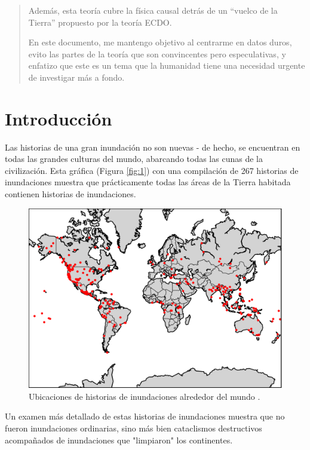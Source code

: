 \documentclass[10pt,twocolumn,letterpaper]{article}
\begin{document}
\begin{abstract}
Además, esta teoría cubre la física causal detrás de un “vuelco de la Tierra” propuesto por la teoría ECDO.

En este documento, me mantengo objetivo al centrarme en datos duros, evito las partes de la teoría que son convincentes pero especulativas, y enfatizo que este es un tema que la humanidad tiene una necesidad urgente de investigar más a fondo.
\end{abstract}

\section{Introducción}

Las historias de una gran inundación no son nuevas - de hecho, se encuentran en todas las grandes culturas del mundo, abarcando todas las cunas de la civilización. Esta gráfica (Figura \ref{fig:1}) con una compilación de 267 historias de inundaciones \cite{3} muestra que prácticamente todas las áreas de la Tierra habitada contienen historias de inundaciones.

\begin{figure}[h]
\begin{center}
   \includegraphics[width=1\linewidth]{b.png}
\end{center}
   \caption{Ubicaciones de historias de inundaciones alrededor del mundo \cite{3}.}
\label{fig:1}
\label{fig:onecol}
\end{figure}

Un examen más detallado de estas historias de inundaciones muestra que no fueron inundaciones ordinarias, sino más bien cataclismos destructivos acompañados de inundaciones que "limpiaron" los continentes.
\end{document}
